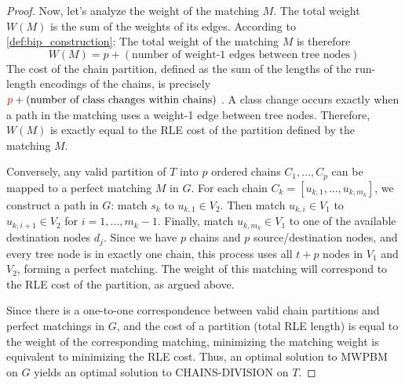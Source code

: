 \begin{proof}
    Now, let's analyze the weight of the matching $M$. The total weight $W(M)$ is the sum of the weights of its edges. According to \cref{def:bip_construction}:
     
    The total weight of the matching $M$ is therefore 
    $$W(M) = p + (\text{number of weight-1 edges between tree nodes})$$
    The cost of the chain partition, defined as the sum of the lengths of the run-length encodings of the chains, is precisely ${\color{red}{p}} + (\text{number of class changes within chains})$ . A class change occurs exactly when a path in the matching uses a weight-1 edge between tree nodes.
    Therefore, $W(M)$ is exactly equal to the RLE cost of the partition defined by the matching $M$.

    Conversely, any valid partition of $T$ into $p$ ordered chains $C_1, \dots, C_p$ can be mapped to a perfect matching $M$ in $G$. For each chain $C_k = [u_{k,1}, \dots, u_{k,m_k}]$, we construct a path in $G$: match $s_k$ to $u_{k,1} \in V_2$. Then match $u_{k,i} \in V_1$ to $u_{k,i+1} \in V_2$ for $i=1, \dots, m_k-1$. Finally, match $u_{k,m_k} \in V_1$ to one of the available destination nodes $d_j$. Since we have $p$ chains and $p$ source/destination nodes, and every tree node is in exactly one chain, this process uses all $t+p$ nodes in $V_1$ and $V_2$, forming a perfect matching. The weight of this matching will correspond to the RLE cost of the partition, as argued above.

    Since there is a one-to-one correspondence between valid chain partitions and perfect matchings in $G$, and the cost of a partition (total RLE length) is equal to the weight of the corresponding matching, minimizing the matching weight is equivalent to minimizing the RLE cost. Thus, an optimal solution to \textsc{MWPBM} on $G$ yields an optimal solution to \textsc{CHAINS-DIVISION} on $T$.
\end{proof}

